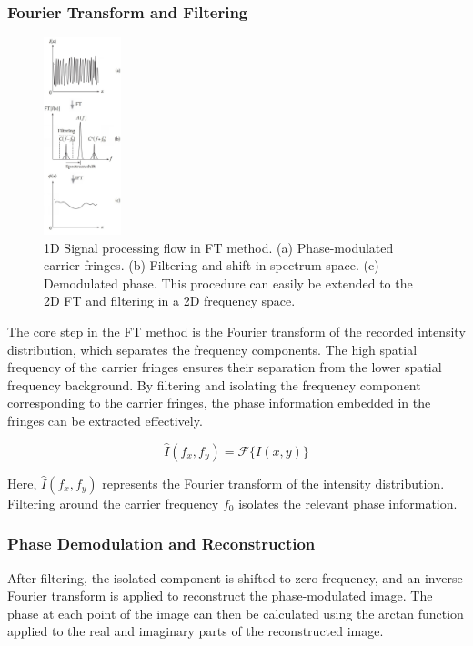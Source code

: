 \documentclass[../main.tex]{subfiles}
\begin{document}
\subsubsection{Fourier Transform and Filtering}
\begin{minipage}{\textwidth}
\begin{figure}
    \vspace{-1cm}
    \includegraphics[width=0.2\textwidth]{Images/Introduction/fourier_transform2}
    \vspace{-8pt}
    \caption{1D Signal processing flow in FT method.
    (a) Phase-modulated carrier fringes.
    (b) Filtering and shift in spectrum space.
    (c) Demodulated phase. 
    This procedure can easily be extended to the 2D FT and filtering in a 2D frequency space. \cite{fringe_analysis}}
    \label{fig:fourier_transform}
\end{figure}
The core step in the FT method is the Fourier transform of the recorded intensity distribution, which separates the frequency components. The high spatial frequency of the carrier fringes ensures their separation from the lower spatial frequency background. By filtering and isolating the frequency component corresponding to the carrier fringes, the phase information embedded in the fringes can be extracted effectively.

\begin{equation}
    \hat{I}(f_x, f_y) = \mathcal{F}\{I(x, y)\}
\end{equation}

Here, \( \hat{I}(f_x, f_y) \) represents the Fourier transform of the intensity distribution. Filtering around the carrier frequency \( f_0 \) isolates the relevant phase information.

\subsubsection{Phase Demodulation and Reconstruction}
After filtering, the isolated component is shifted to zero frequency, and an inverse Fourier transform is applied to reconstruct the phase-modulated image. The phase at each point of the image can then be calculated using the arctan function applied to the real and imaginary parts of the reconstructed image.


\end{minipage}
\end{document}
